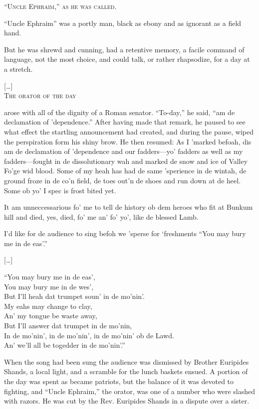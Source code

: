 \begin{ipquote}
{\centering
\textsc{“Uncle Ephraim,” as he was called.}

“Uncle Ephraim” was a portly man, black as ebony and as ignorant as a field hand.} {But he was shrewd and cunning, had a retentive memory, a facile command of language, not the most choice, and could talk, or rather rhapsodize, for a day at a stretch.

\centering
{[…]}\\
\textsc{The orator of the day}

arose with all of the dignity of a Roman senator. “To-day,” he said, “am de declamation of ’dependence.” After having made that remark, he paused to see what effect the startling announcement had created, and during the pause, wiped the perspiration form his shiny brow. He then resumed: As I ’marked befoah, dis am de declamation of ’dependence and our fadders—yo’ fadders as well as my fadders—fought in de dissolutionary wah and marked de snow and ice of Valley Fo’ge wid blood. Some of my heah has had de same ’sperience in de wintah, de ground froze in de co’n field, de to{\kern0pt}es out’n de sho{\kern0pt}es and run down at de heel. Some ob yo’ I spec is frost bited yet.}

{It am unneccessarious fo’ me to tell de history ob dem hero{\kern0pt}es who fit at Bunkum hill and died, yes, died, fo’ me an’ fo’ yo’, like de blessed Lamb.

I’d like for de audience to sing befoh we ’sperse for ‘freshments “You may bury me in de eas’.”

\centering
{[…]}


“You may bury me in de eas’,\\
You may bury me in de wes’,\\
But I’ll heah dat trumpet soun’ in de mo’nin’.\\
My eahs may change to clay,\\
An’ my tongue be waste away,\\
But I’ll answer dat trumpet in de mo’nin,\\
In de mo’nin’, in de mo’nin’, in de mo’nin’ ob de Lawd.\\
An’ we’ll all be togedder in de mo’nin’.”


When the song had been sung the audience was dismissed by Brother Euripides Shands, a local light, and a scramble for the lunch baskets ensued. A portion of the day was spent as became patriots, but the balance of it was devoted to fighting, and “Uncle Ephraim,” the orator, was one of a number who were slashed with razors. He was cut by the Rev. Euripides Shands in a dispute over a sister.}
\end{ipquote}




